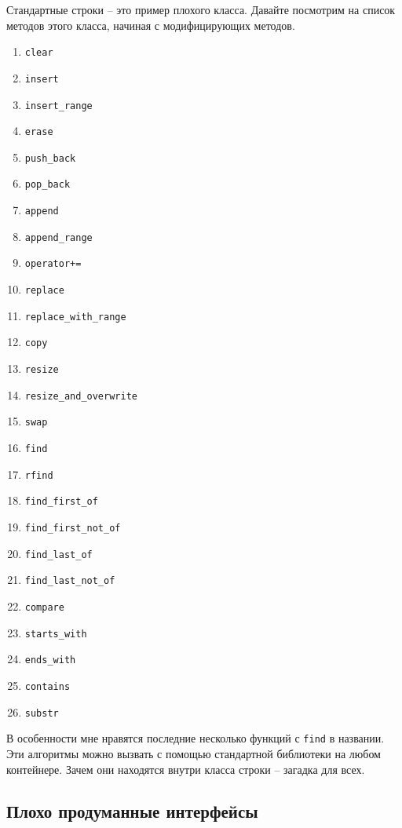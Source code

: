 Стандартные строки -- это пример плохого класса.
Давайте посмотрим на список методов этого класса, начиная с модифицирующих методов.
\begin{multicols}{3}
\begin{enumerate}
\item \texttt{clear}
\item \texttt{insert}
\item \texttt{insert\_range}
\item \texttt{erase}
\item \texttt{push\_back}
\item \texttt{pop\_back}
\item \texttt{append}
\item \texttt{append\_range}
\item \texttt{operator+=}
\item \texttt{replace}
\item \texttt{replace\_with\_range}
\item \texttt{copy}
\item \texttt{resize}
\item \texttt{resize\_and\_overwrite}
\item \texttt{swap}
\item \texttt{find}
\item \texttt{rfind}
\item \texttt{find\_first\_of}
\item \texttt{find\_first\_not\_of}
\item \texttt{find\_last\_of}
\item \texttt{find\_last\_not\_of}
\item \texttt{compare}
\item \texttt{starts\_with}
\item \texttt{ends\_with}
\item \texttt{contains}
\item \texttt{substr}
\end{enumerate}
\end{multicols}
В особенности мне нравятся последние несколько функций с \verb"find" в названии.
Эти алгоритмы можно вызвать с помощью стандартной библиотеки на любом контейнере.
Зачем они находятся внутри класса строки -- загадка для всех.

\subsection{Плохо продуманные интерфейсы}
\label{section::BadInterfaces}

